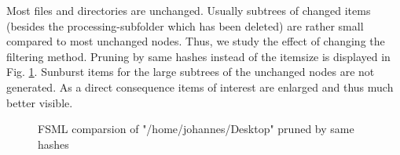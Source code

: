 Most files and directories are unchanged. Usually subtrees of changed items (besides the processing-subfolder which has been deleted) are rather small compared to most unchanged nodes. Thus, we study the effect of changing the filtering method. Pruning by same hashes instead of the itemsize is displayed in Fig. \ref{fig:fsml-pruned-by-samehashes}. Sunburst items for the large subtrees of the unchanged nodes are not generated. As a direct consequence items of interest are enlarged and thus much better visible. %

\begin{figure}[tb]
\caption{\label{fig:fsml-pruned-by-samehashes} FSML comparsion of "/home/johannes/Desktop" pruned by same hashes}
\end{figure}

